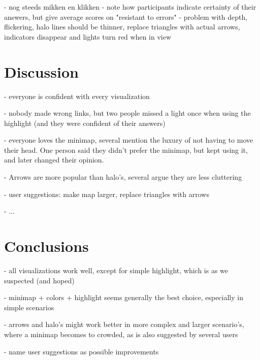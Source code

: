 - nog steeds mikken en klikken
- note how participants indicate certainty of their answers, but give average scores on "resistant to errors"
- problem with depth, flickering, halo lines should be thinner, replace triangles with actual arrows, indicators disappear and lights turn red when in view

\section{Discussion} \label{sec:user:discussion}
- everyone is confident with every visualization

- nobody made wrong links, but two people missed a light once when using the highlight (and they were confident of their answers)

- everyone loves the minimap, several mention the luxury of not having to move their head. One person said they didn't prefer the minimap, but kept using it, and later changed their opinion.

- Arrows are more popular than halo's, several argue they are less cluttering

- user suggestions: make map larger, replace triangles with arrows

- ...

\section{Conclusions} \label{sec:user:conclusions}
- all visualizations work well, except for simple highlight, which is as we suspected (and hoped)

- minimap + colors + highlight seems generally the best choice, especially in simple scenarios

- arrows and halo's might work better in more complex and larger scenario's, where a minimap becomes to crowded, as is also suggested by several users

- name user suggestions as possible improvements
